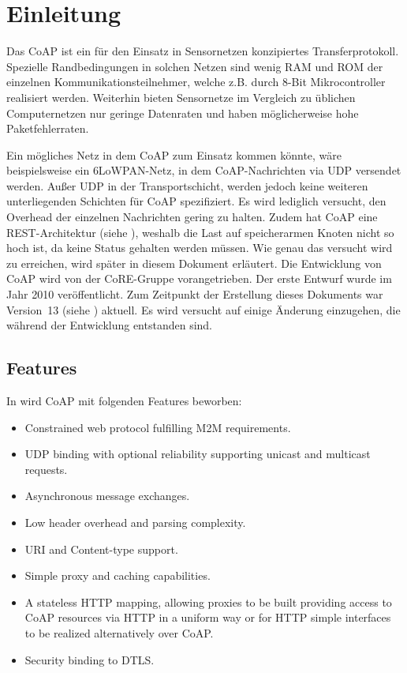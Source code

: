 \section{Einleitung}
Das \ac{CoAP} ist ein für den Einsatz in Sensornetzen konzipiertes Transferprotokoll.
Spezielle Randbedingungen in solchen Netzen sind wenig \ac{RAM} und \ac{ROM} der einzelnen
Kommunikationsteilnehmer, welche z.B. durch 8-Bit Mikrocontroller realisiert werden.
Weiterhin bieten Sensornetze im Vergleich zu üblichen Computernetzen nur geringe Datenraten und
haben möglicherweise hohe Paketfehlerraten.

Ein mögliches Netz in dem \ac{CoAP} zum Einsatz kommen könnte, wäre
beispielsweise ein \ac{6LoWPAN}-Netz, in dem \ac{CoAP}-Nachrichten via \ac{UDP}
versendet werden.
Außer UDP in der Transportschicht, werden jedoch keine weiteren unterliegenden
Schichten für \ac{CoAP} spezifiziert.
Es wird lediglich versucht, den Overhead der einzelnen Nachrichten gering zu
halten.
Zudem hat \ac{CoAP} eine \ac{REST}-Architektur (siehe \cite{Fielding:2000:ASD:932295}), weshalb die Last auf
speicherarmen Knoten nicht so hoch ist, da keine Status gehalten werden müssen.
Wie genau das versucht wird zu erreichen, wird später in diesem Dokument
erläutert.
Die Entwicklung von \ac{CoAP} wird von der \ac{CoRE}-Gruppe vorangetrieben. Der
erste Entwurf wurde im Jahr 2010 veröffentlicht.
Zum Zeitpunkt der Erstellung dieses Dokuments war Version~13 (siehe \cite{draft-ietf-core-coap-13}) aktuell. Es wird
versucht auf einige Änderung einzugehen, die während der Entwicklung entstanden
sind.

\subsection{Features}
In \cite{draft-ietf-core-coap-13} wird \ac{CoAP} mit folgenden Features beworben:
\begin{itemize}
    \item Constrained web protocol fulfilling \ac{M2M} requirements.
    \item \ac{UDP} binding with optional reliability supporting unicast and multicast requests.
    \item Asynchronous message exchanges.
    \item Low header overhead and parsing complexity.
    \item \ac{URI} and Content-type support.
    \item Simple proxy and caching capabilities.
    \item A stateless \ac{HTTP} mapping, allowing proxies to be built providing access to \ac{CoAP}
    resources via \ac{HTTP} in a uniform way or for \ac{HTTP} simple interfaces to be realized
    alternatively over \ac{CoAP}.
    \item Security binding to \ac{DTLS}.
\end{itemize}

